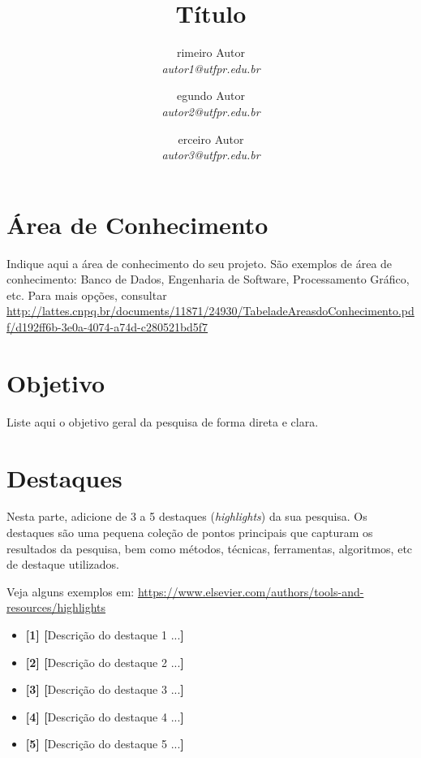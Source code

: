 \documentclass{ForPPGCPR-resumo}
\author{
  \fcolorbox{colorForPPGCPR}{colorForPPGCPR}{\color{white}\textbf{P}}rimeiro Autor\\
  \textit{autor1@utfpr.edu.br}
  \and
  \fcolorbox{colorForPPGCPR}{colorForPPGCPR}{\color{white}\textbf{S}}egundo Autor\\
  \textit{autor2@utfpr.edu.br}
  \and
  \fcolorbox{colorForPPGCPR}{colorForPPGCPR}{\color{white}\textbf{T}}erceiro Autor\\
  \textit{autor3@utfpr.edu.br}
}
\title{Título}
\begin{document}
   
\maketitle

\section*{Área de Conhecimento}
\textcolor{colorForPPGCPR}{Indique aqui a área de conhecimento do seu projeto. São exemplos de área de conhecimento: Banco de Dados, Engenharia de Software, Processamento Gráfico, etc. Para mais opções, consultar 
\url{http://lattes.cnpq.br/documents/11871/24930/TabeladeAreasdoConhecimento.pdf/d192ff6b-3e0a-4074-a74d-c280521bd5f7}}

\section*{Objetivo}

        \textcolor{colorForPPGCPR}{Liste aqui o objetivo geral da pesquisa de forma direta e clara.}

\section*{Destaques}
        
\textcolor{colorForPPGCPR}{Nesta parte, adicione de 3 a 5 destaques (\textit{highlights}) da sua pesquisa. Os destaques são uma pequena coleção de pontos principais que capturam os resultados da pesquisa, bem como métodos, técnicas, ferramentas, algoritmos, etc de destaque utilizados.}        
        
\textcolor{colorForPPGCPR}{Veja alguns exemplos em: \url{https://www.elsevier.com/authors/tools-and-resources/highlights}}
        
        \begin{itemize}[leftmargin=*]
	\setlength\itemsep{-0.3em}
	\item \textbf{[1] [}\textcolor{colorForPPGCPR}{Descrição do destaque 1 ...}\textbf{]}
	\item \textbf{[2] [}\textcolor{colorForPPGCPR}{Descrição do destaque 2 ...}\textbf{]}
	\item \textbf{[3] [}\textcolor{colorForPPGCPR}{Descrição do destaque 3 ...}\textbf{]}
	\item \textbf{[4] [}\textcolor{colorForPPGCPR}{Descrição do destaque 4 ...}\textbf{]}
	\item \textbf{[5] [}\textcolor{colorForPPGCPR}{Descrição do destaque 5 ...}\textbf{]}
\end{itemize}
\end{document}
